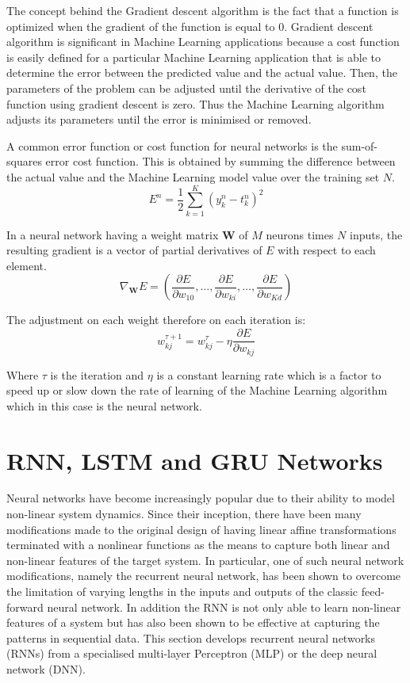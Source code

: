 The concept behind the Gradient descent algorithm is the fact that a function is optimized when the gradient of the function is equal to $0$.  Gradient descent algorithm is significant in Machine Learning applications because a cost function is easily defined for a particular Machine Learning application that is able to determine the error between the predicted value and the actual value.  Then, the parameters of the problem can be adjusted until the derivative of the cost function using gradient descent is zero.  Thus the Machine Learning algorithm adjusts its parameters until the error is minimised or removed.

A common error function or cost function for neural networks is the sum-of-squares error cost function.  This is obtained by summing the difference between the actual value and the Machine Learning model value over the training set $N$. 
\begin{equation}
E^n=\frac{1}{2}\sum_{k=1}^K(y_k^n-t_k^n)^2
\label{eqn_c3_nn_09}\end{equation}

In a neural network having a weight matrix $\mathbf{W}$ of $M$ neurons times $N$ inputs, the resulting gradient is a vector of partial derivatives of $E$ with respect to each element.  
\begin{equation}\nabla_{\mathbf{W}}E=\left(\frac{\partial E}{\partial w_{10}},\dots,\frac{\partial E}{\partial w_{ki}},\dots,\frac{\partial E}{\partial w_{Kd}}\right) 
\label{eqn_c3_nn_10}\end{equation}

The adjustment on each weight therefore on each iteration is:
\begin{equation}
w_{kj}^{\tau+1}=w_{kj}^{\tau}-\eta\frac{\partial E}{\partial w_{kj}}
\label{eqn_c3_nn_11}\end{equation}

Where $\tau$ is the iteration and $\eta$ is a constant learning rate which is a factor to speed up or slow down the rate of learning of the Machine Learning algorithm which in this case is the neural network.

\section{RNN, LSTM and GRU Networks}
Neural networks have become increasingly popular due to their ability to model non-linear system dynamics. Since their inception, there have been many modifications made to the original design of having linear affine transformations terminated with a nonlinear functions as the means to capture both linear and non-linear features of the target system. In particular, one of such neural network  modifications, namely the recurrent neural network, has been shown to overcome the limitation of varying lengths in the inputs and outputs of the classic feed-forward neural network.  In addition the RNN is not only able to learn non-linear features of a system but has also been shown to be effective at capturing the patterns in sequential data.  This section develops recurrent neural networks (RNNs) from a specialised multi-layer Perceptron (MLP) or the deep neural network (DNN).

